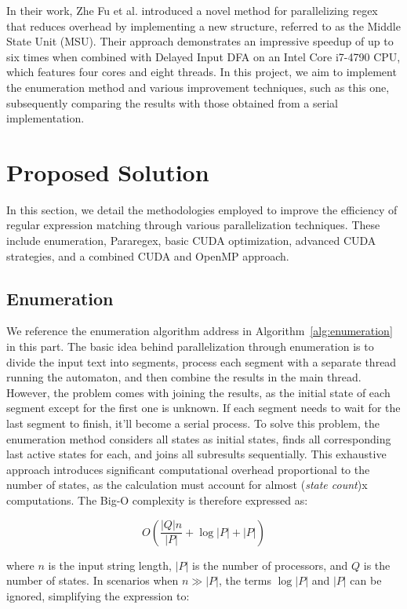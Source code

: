 \documentclass[sigconf]{acmart}
\begin{document}
In their work, Zhe Fu et al. \cite{pararegex} introduced a novel method for parallelizing regex that reduces overhead by implementing a new structure, referred to as the Middle State Unit (MSU). Their approach demonstrates an impressive speedup of up to six times when combined with Delayed Input DFA on an Intel Core i7-4790 CPU, which features four cores and eight threads. In this project, we aim to implement the enumeration method and various improvement techniques, such as this one, subsequently comparing the results with those obtained from a serial implementation.

\section{Proposed Solution}

In this section, we detail the methodologies employed to improve the efficiency of regular expression matching through various parallelization techniques. These include enumeration, Pararegex, basic CUDA optimization, advanced CUDA strategies, and a combined CUDA and OpenMP approach.

\subsection{Enumeration}
We reference the enumeration \cite{enumeration} algorithm address in Algorithm~\ref{alg:enumeration} in this part. The basic idea behind parallelization through enumeration is to divide the input text into segments, process each segment with a separate thread running the automaton, and then combine the results in the main thread. However, the problem comes with joining the results, as the initial state of each segment except for the first one is unknown. If each segment needs to wait for the last segment to finish, it'll become a serial process. To solve this problem, the enumeration method considers all states as initial states, finds all corresponding last active states for each, and joins all subresults sequentially. This exhaustive approach introduces significant computational overhead proportional to the number of states, as the calculation must account for almost (\emph{state count})x computations. The Big-O complexity is therefore expressed as:

\[
	O\left(\frac{|Q|n}{|P|} + \log |P| + |P|\right)
\]

where $n$ is the input string length, $|P|$ is the number of processors, and $Q$ is the number of states. In scenarios when $n \gg |P|$, the terms $\log |P|$ and $|P|$ can be ignored, simplifying the expression to:
\end{document}
